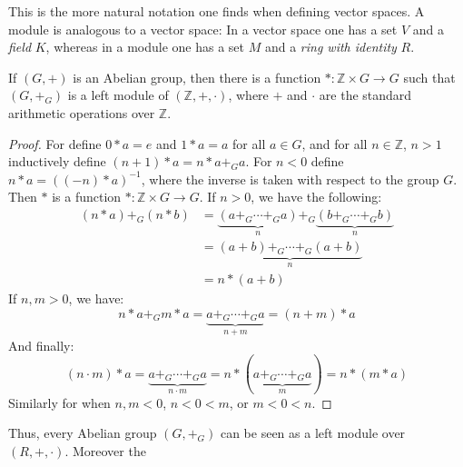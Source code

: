 \documentclass[crop=false,class=book,oneside]{standalone}
\begin{document}
        This is the more natural notation one finds when defining
        vector spaces. A module is analogous to a vector space:
        In a vector space one has a set $V$ and a
        \textit{field} $K$, whereas in a module one has a set
        $M$ and a \textit{ring with identity} $R$.
        \begin{theorem}
            If $(G,+)$ is an Abelian group, then there is a
            function $*:\mathbb{Z}\times{G}\rightarrow{G}$
            such that $(G,+_{G})$ is a left module of
            $(\mathbb{Z},+,\cdot)$, where $+$ and $\cdot$ are
            the standard arithmetic operations over $\mathbb{Z}$.
        \end{theorem}
        \begin{proof}
            For define $0*a=e$ and $1*a=a$ for all $a\in{G}$,
            and for all
            $n\in\mathbb{Z}$, $n>1$ inductively define
            $(n+1)*a=n*a+_{G}a$. For $n<0$ define
            $n*a=((-n)*a)^{-1}$, where the inverse is taken
            with respect to the group $G$. Then $*$ is a function
            $*:\mathbb{Z}\times{G}\rightarrow{G}$. If $n>0$, we
            have the following:
            \begin{align*}
                (n*a)+_{G}(n*b)
                &=\underset{n}{\underbrace{(a+_{G}\cdots+_{G}a)}}
                +_{G}
                \underset{n}{\underbrace{(b+_{G}\cdots+_{G}b)}}\\
                &=\underset{n}
                    {\underbrace{(a+b)+_{G}\cdots+_{G}(a+b)}}\\
                &=n*(a+b)
            \end{align*}
            If $n,m>0$, we have:
            \begin{equation*}
                n*a+_{G}m*a
                =\underset{n+m}{\underbrace{a+_{G}\cdots+_{G}a}}
                =(n+m)*a
            \end{equation*}
            And finally:
            \begin{equation*}
                (n\cdot{m})*a=
                \underset{n\cdot{m}}
                    {\underbrace{a+_{G}\cdots+_{G}a}}
                =n*(\underset{m}{\underbrace{a+_{G}\cdots+_{G}a}})
                =n*(m*a)
            \end{equation*}
            Similarly for when $n,m<0$, $n<0<m$, or $m<0<n$.
        \end{proof}
        Thus, every Abelian group $(G,+_{G})$ can be seen
        as a left module over $(R,+,\cdot)$. Moreover the
\end{document}
